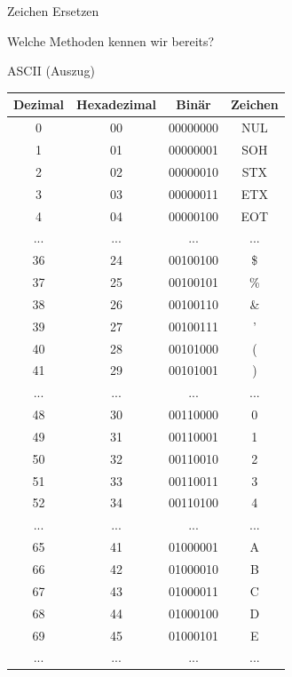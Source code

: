 \begin{frame}{Zeichen Ersetzen}
\begin{center}
Welche Methoden kennen wir bereits?
\end{center}
\end{frame}

\begin{frame}[fragile]{ASCII (Auszug)}
\begin{table}[H]
	\centering
	\tiny
	\begin{tabular}{cccc}
		\toprule
		Dezimal & Hexadezimal & Binär & Zeichen \\
		\midrule
		0 & 00 & 00000000 & NUL \\
		1 & 01 & 00000001 & SOH \\
		2 & 02 & 00000010 & STX \\
		3 & 03 & 00000011 & ETX \\
		4 & 04 & 00000100 & EOT \\\midrule
		... & ... & ... & ... \\\midrule
		36 & 24 & 00100100 & \$ \\
		37 & 25 & 00100101 & \% \\
		38 & 26 & 00100110 & \& \\
		39 & 27 & 00100111 & ' \\
		40 & 28 & 00101000 & ( \\
		41 & 29 & 00101001 & ) \\\midrule
		... & ... & ... & ... \\\midrule
		48 & 30 & 00110000 & 0 \\
		49 & 31 & 00110001 & 1 \\
		50 & 32 & 00110010 & 2 \\
		51 & 33 & 00110011 & 3 \\
		52 & 34 & 00110100 & 4 \\\midrule
		... & ... & ... & ... \\\midrule
		65 & 41 & 01000001 & A \\
		66 & 42 & 01000010 & B \\
		67 & 43 & 01000011 & C \\
		68 & 44 & 01000100 & D \\
		69 & 45 & 01000101 & E \\\midrule
		... & ... & ... & ... \\\bottomrule
	\end{tabular}
\end{table}
\end{frame}

